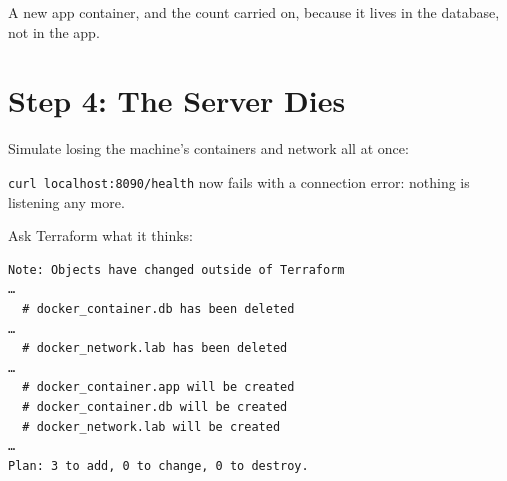 A new app container, and the count carried on, because it lives in the database, not in the app.


\section{Step 4: The Server Dies}\label{11-lab-rebuild-everything-from-code:step-4-the-server-dies}

Simulate losing the machine's containers and network all at once:

\begin{codeblock}

\begin{Shaded}
\begin{Highlighting}[]
\end{Highlighting}
\end{Shaded}

\end{codeblock}

\texttt{curl\ localhost:}\allowbreak{}\texttt{8090/}\allowbreak{}\texttt{health} now fails with a connection error: nothing is listening any more.


Ask Terraform what it thinks:

\begin{codeblock}

\begin{Shaded}
\begin{Highlighting}[]
\end{Highlighting}
\end{Shaded}

\end{codeblock}

\begin{codeblock}
\begin{Verbatim}[formatcom=\outputstyle]
Note: Objects have changed outside of Terraform
…
  # docker_container.db has been deleted
…
  # docker_network.lab has been deleted
…
  # docker_container.app will be created
  # docker_container.db will be created
  # docker_network.lab will be created
…
Plan: 3 to add, 0 to change, 0 to destroy.
\end{Verbatim}
\end{codeblock}

